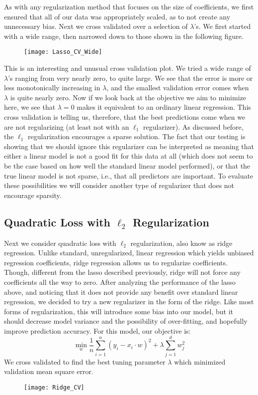 \documentclass[letterpaper, 10 pt, conference]{ieeeconf}  %
\begin{document}
As with any regularization method that focuses on the size of coefficients, we first ensured that all of our data was appropriately scaled, as to not create any unnecessary bias. Next we cross validated over a selection of $\lambda$'s. We first started with a wide range, then narrowed down to those shown in the following figure.
\begin{figure}[ht]
\label{Lasso CV Error Plot}
\begin{center}
\texttt{[image: Lasso\_CV\_Wide]}
\end{center}
\end{figure}
This is an interesting and unusual cross validation plot. We tried a wide range of $\lambda$'s ranging from very nearly zero, to quite large. We see that the error is more or less monotonically increasing in $\lambda$, and the smallest validation error comes when $\lambda$ is quite nearly zero. Now if we look back at the objective we aim to minimize here, we see that $\lambda=0$ makes it equivalent to an ordinary linear regression. This cross validation is telling us, therefore, that the best predictions come when we are not regularizing (at least not with an $\ell_1$ regularizer). As discussed before, the $\ell_1$ regularization encourages a sparse solution. The fact that our testing is showing that we should ignore this regularizer can be interpreted as meaning that either a linear model is not a good fit for this data at all (which does not seem to be the case based on how well the standard linear model performed), or that the true linear model is not sparse, i.e., that all predictors are important. To evaluate these possibilities we will consider another type of regularizer that does not encourage sparsity.

\subsection{Quadratic Loss with $\ell_2$ Regularization}
Next we consider quadratic loss with $\ell_2$ regularization, also know as ridge regression. Unlike standard, unregularized, linear regression which yields unbiased regression coefficients, ridge regression allows us to regularize coefficients. Though, different from the lasso described previously, ridge will not force any coefficients all the way to zero. After analyzing the performance of the lasso above, and noticing that it does not provide any benefit over standard linear regression, we decided to try a new regularizer in the form of the ridge. Like most forms of regularization, this will introduce some bias into our model, but it should decrease model variance and the possibility of over-fitting, and hopefully improve prediction accuracy. For this model, our objective is:
\[
	\min_w \frac{1}{n}\sum_{i=1}^n (y_i - x_i\cdot w)^2 + \lambda \sum_{j=1}^d w_j^2
\]
We cross validated to find the best tuning parameter $\lambda$ which minimized validation mean square error.
\begin{figure}[ht]
\label{Ridge CV Error Plot}
\begin{center}
\texttt{[image: Ridge\_CV]}
\end{center}
\end{figure}
\end{document}
